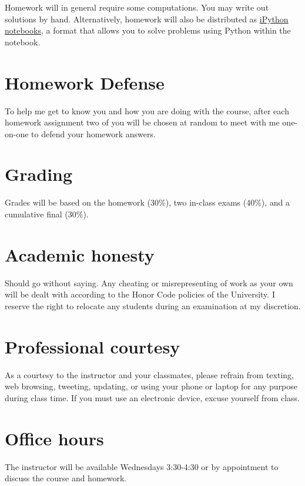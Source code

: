 \documentclass[11pt]{article}
\begin{document}
Homework will in general require some computations. You may write out solutions by hand. Alternatively, homework will also be distributed as \href{https://ipython.org/notebook.html}{iPython notebooks}, a format that allows you to solve problems using Python within the notebook.
\section{Homework Defense}
\label{sec:orgb470c73}
To help me get to know you and how you are doing with the course, after each homework assignment two of you will be chosen at random to meet with me one-on-one to defend your homework answers.

\section{Grading}
\label{sec:org2a58156}
Grades will be based on the homework (30\%), two in-class exams (40\%), and a cumulative final (30\%).

\section{Academic honesty}
\label{sec:org83e1fff}
Should go without saying. Any cheating or misrepresenting of work as your own will be dealt with according to the Honor Code policies of the University. I reserve the right to relocate any students during an examination at my discretion.

\section{Professional courtesy}
\label{sec:orge73d63a}
As a courtesy to the instructor and your classmates, please refrain from
texting, web browsing, tweeting, updating, or using your phone or laptop for any
purpose during class time.  If you must use an electronic device, excuse
yourself from class.

\section{Office hours}
\label{sec:org2672737}
The instructor will be available Wednesdays 3:30-4:30 or by appointment to discuss the course and homework.
\end{document}
